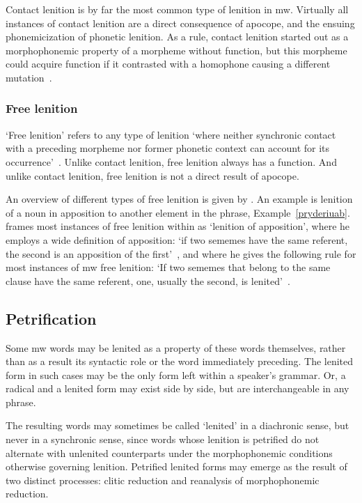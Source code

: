 Contact lenition is by far the most common type of lenition in \gls{mw}. Virtually all instances of contact lenition are a direct consequence of apocope, and the ensuing phonemicization of phonetic lenition. As a rule, contact lenition started out as a morphophonemic property of a morpheme without function, but this morpheme could acquire function if it contrasted with a homophone causing a different mutation~\autocite[1]{schrijver_free_2010}.
\subsubsection{Free lenition}
`Free lenition' refers to any type of lenition `where neither synchronic contact with a preceding morpheme nor former phonetic context can account for its occurrence'~\autocite[1]{schrijver_free_2010}. Unlike contact lenition, free lenition always has a function. And unlike contact lenition, free lenition is not a direct result of apocope. 

An overview of different types of free lenition is given by \textcite{schrijver_free_2010}. An example is lenition of a noun in apposition to another element in the phrase, \eg Example~\ref{pryderiuab}.
\Textcite{schrijver_free_2010} frames most instances of free lenition within as `lenition of apposition', where he employs a wide definition of apposition: `if two sememes have the same referent, the second is an apposition of the first'~\autocite[3]{schrijver_free_2010}, and where he gives the following rule for most instances of \gls{mw} free lenition: `If two sememes that belong to the same clause have the same referent, one, usually the second, is lenited'~\autocite[3]{schrijver_free_2010}.

\subsection{Petrification}
Some \gls{mw} words may be lenited as a property of these words themselves, rather than as a result its syntactic role or the word immediately preceding.  The lenited form in such cases may be the only form left within a speaker's grammar. Or, a radical and a lenited form may exist side by side, but are interchangeable in any phrase.

The resulting words may sometimes be called `lenited' in a diachronic sense, but never in a synchronic sense, since words whose lenition is petrified do not alternate with unlenited counterparts under the morphophonemic conditions otherwise governing lenition. Petrified lenited forms may emerge as the result of two distinct processes: clitic reduction and reanalysis of morphophonemic reduction.

